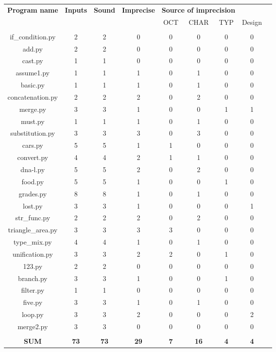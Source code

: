 \begin{tabular} {ccccccccc}
	\textbf{Program name} & \textbf{Inputs} & \textbf{Sound} & \textbf{Imprecise} & \multicolumn{3}{c}{ \textbf{Source of imprecision} } & & \\

	& & & & OCT & CHAR & TYP & Design \\
	\hline \\ 
	if_condition.py & 2 & 2 & 0 & 0 & 0 & 0 & 0\\
	add.py & 2 & 2 & 0 & 0 & 0 & 0 & 0 \\
	cast.py & 1 & 1 & 0 & 0 & 0 & 0 & 0 \\
	assume1.py & 1 & 1 & 1 & 0 & 1 & 0 & 0\\
	basic.py & 1 & 1 & 1 & 0 & 1 & 0 & 0 \\
	concatenation.py & 2 & 2 & 2 & 0 & 2 & 0 & 0 \\
	merge.py & 3 & 3 & 1 & 0 & 0 & 1 & 1 \\
	must.py & 1 & 1 & 1 & 0 & 1 & 0 & 0 \\
	substitution.py & 3 & 3 & 3 & 0 & 3 & 0 & 0\\
	cars.py & 5 & 5 & 1 & 1 & 0 & 0 & 0 \\
	convert.py & 4 & 4 & 2 & 1 & 1 & 0 & 0 \\
	dna-l.py & 5 & 5 & 2 & 0 & 2 & 0 & 0\\
	food.py & 5 & 5 & 1 & 0 & 0 & 1 & 0 \\
	grades.py & 8 & 8 & 1 & 0 & 1 & 0 & 0 \\
	lost.py & 3 & 3 & 1 & 0 & 0 & 0 & 1  \\
	str_func.py & 2 & 2 & 2 & 0 & 2 & 0 & 0 \\
	triangle_area.py & 3 & 3 & 3 & 3 & 0 & 0 & 0 \\
	type_mix.py & 4 & 4 & 1 & 0 & 1 & 0 & 0 \\
	unification.py & 3 & 3 & 2 & 2 & 0 & 1 & 0 \\
	123.py & 2 & 2 & 0 & 0 & 0 & 0 & 0 \\
	branch.py & 3 & 3 & 1 & 0 & 0 & 1 & 0  \\
	filter.py & 1 & 1 & 0 & 0 & 0 & 0 & 0 \\
	five.py & 3 & 3 & 1 & 0 & 1 & 0 & 0 \\
	loop.py & 3 & 3 & 2 & 0 & 0 & 0 & 2  \\
	merge2.py & 3 & 3 & 0 & 0 & 0 & 0 & 0 \\
	\hline \\
	\textbf{SUM} & \textbf{73} & \textbf{73} & \textbf{29} & \textbf{7} & \textbf{16} & \textbf{4} & \textbf{4} & \\
\end{tabular} 

